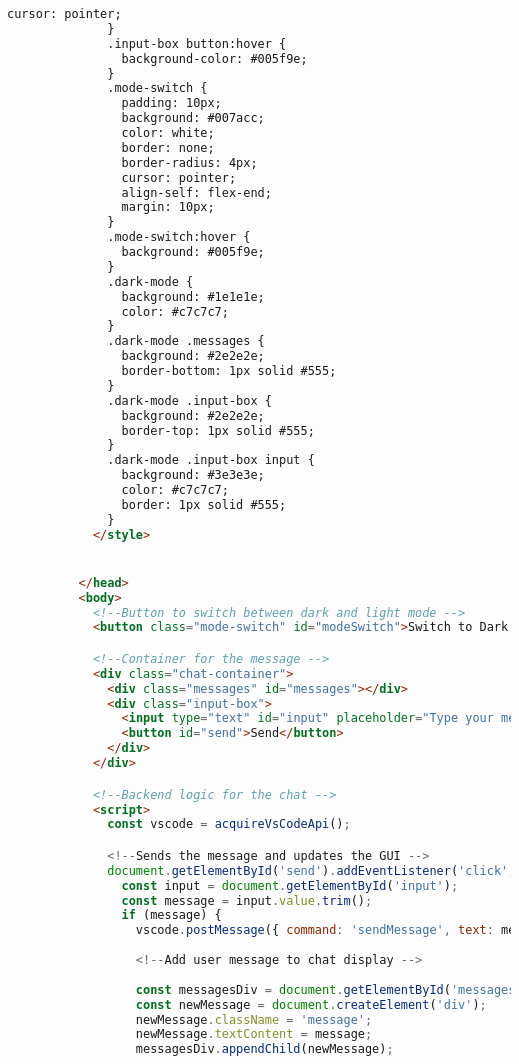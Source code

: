 \begin{lstlisting}[language=HTML, caption={IDE Chat GUI}]
                cursor: pointer;
              }
              .input-box button:hover {
                background-color: #005f9e;
              }
              .mode-switch {
                padding: 10px;
                background: #007acc;
                color: white;
                border: none;
                border-radius: 4px;
                cursor: pointer;
                align-self: flex-end;
                margin: 10px;
              }
              .mode-switch:hover {
                background: #005f9e;
              }
              .dark-mode {
                background: #1e1e1e;
                color: #c7c7c7;
              }
              .dark-mode .messages {
                background: #2e2e2e;
                border-bottom: 1px solid #555;
              }
              .dark-mode .input-box {
                background: #2e2e2e;
                border-top: 1px solid #555;
              }
              .dark-mode .input-box input {
                background: #3e3e3e;
                color: #c7c7c7;
                border: 1px solid #555;
              }
            </style>


          </head>
          <body>
            <!--Button to switch between dark and light mode -->
            <button class="mode-switch" id="modeSwitch">Switch to Dark Mode</button>

            <!--Container for the message -->
            <div class="chat-container">
              <div class="messages" id="messages"></div>
              <div class="input-box">
                <input type="text" id="input" placeholder="Type your message..." />
                <button id="send">Send</button>
              </div>
            </div>

            <!--Backend logic for the chat -->
            <script>
              const vscode = acquireVsCodeApi();

              <!--Sends the message and updates the GUI -->
              document.getElementById('send').addEventListener('click', () => {
                const input = document.getElementById('input');
                const message = input.value.trim();
                if (message) {
                  vscode.postMessage({ command: 'sendMessage', text: message });
      
                  <!--Add user message to chat display -->
                  
                  const messagesDiv = document.getElementById('messages');
                  const newMessage = document.createElement('div');
                  newMessage.className = 'message';
                  newMessage.textContent = message;
                  messagesDiv.appendChild(newMessage);
      

\end{lstlisting}
